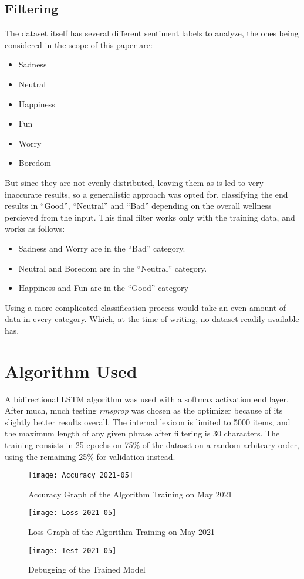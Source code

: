 \subsection{Filtering}
The dataset itself has several different sentiment labels to analyze, the ones being considered in the scope of this paper are:
\begin{itemize}
	\item Sadness
	\item Neutral
	\item Happiness
	\item Fun
	\item Worry
	\item Boredom
\end{itemize}
But since they are not evenly distributed, leaving them as-is led to very inaccurate results, so a generalistic approach was opted for, classifying the end results in ``Good'', ``Neutral'' and ``Bad'' depending on the overall wellness percieved from the input.
This final filter works only with the training data, and works as follows:
\begin{itemize}
	\item Sadness and Worry are in the ``Bad'' category.
	\item Neutral and Boredom are in the ``Neutral'' category.
	\item Happiness and Fun are in the ``Good'' category
\end{itemize}
Using a more complicated classification process would take an even amount of data in every category. Which, at the time of writing, no dataset readily available has.

\section{Algorithm Used}
A bidirectional LSTM algorithm was used with a softmax activation end layer. After much, much testing \textit{rmsprop} was chosen as the optimizer because of its slightly better results overall.
The internal lexicon is limited to 5000 items, and the maximum length of any given phrase after filtering is 30 characters.
The training consists in 25 epochs on 75\% of the dataset on a random arbitrary order, using the remaining 25\% for validation instead.
\begin{figure}[!h]
	\centering
	\texttt{[image: Accuracy 2021-05]}
	\caption{Accuracy Graph of the Algorithm Training on May 2021}
	\label{fig:accuracy2021}
	\texttt{[image: Loss 2021-05]}
	\caption{Loss Graph of the Algorithm Training on May 2021}
	\label{fig:loss2021}
\end{figure}
\begin{figure}[!h]
	\centering
	\texttt{[image: Test 2021-05]}
	\caption{Debugging of the Trained Model}
	\label{fig:test}
\end{figure}
\pagebreak

